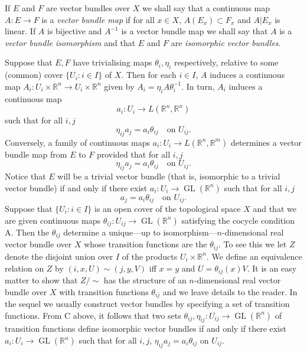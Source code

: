 If $E$ and $F$ are vector bundles over $X$ we shall say that a continuous map $A:E\to F$ is a \emph{vector bundle map} if for all $x\in X$, $A(E_x)\subset F_x$ and $A|E_x$ is linear. If $A$ is bijective and $A^{-1}$ is a vector bundle map we shall say that $A$ is a \emph{vector bundle isomorphism} and that $E$ and $F$ are \emph{isomorphic vector bundles}.

Suppose that $E,F$ have trivialising maps $\theta_i,\eta_i$ respectively, relative to some (common) cover $\{U_i:i\in I\}$ of $X$. Then for each $i\in I$, $A$ induces a continuous map $A_i:U_i\times\mathbb R^n\to U_i\times\mathbb R^n$ given by $A_i=\eta_i A\theta_i^{-1}$. In turn, $A_i$ induces a continuous map
\[ a_i:U_i\longrightarrow L(\mathbb R^n,\mathbb R^n) \]
such that for all $i,j$
\[ \eta_{ij}a_j=a_i\theta_{ij}\quad\text{on }U_{ij}. \]
Conversely, a family of continuous maps $a_i:U_i\to L(\mathbb R^n,\mathbb R^m)$ determines a vector bundle map from $E$ to $F$ provided that for all $i,j$
\begin{equation}\eta_{ij}a_j=a_i\theta_{ij}\quad\text{on }U_{ij}.\tag{C}\label{eq:1:c:1}\end{equation}
Notice that $E$ will be a trivial vector bundle (that is, isomorphic to a trivial vector bundle) if and only if there exist $a_i:U_i\to\operatorname{GL}(\mathbb R^n)$ such that for all $i,j$
\[ a_j=a_i\theta_{ij}\quad\text{on }U_{ij}. \]
Suppose that $\{U_i:i\in I\}$ is an open cover of the topological space $X$ and that we are given continuous maps $\theta_{ij}:U_{ij}\to\operatorname{GL}(\mathbb R^n)$ satisfying the cocycle condition A. Then the $\theta_{ij}$ determine a unique---up to isomorphism---$n$-dimensional real vector bundle over $X$ whose transition functions are the $\theta_{ij}$. To see this we let $Z$ denote the disjoint union over $I$ of the products $U_i\times\mathbb R^n$. We define an equivalence relation on $Z$ by $(i,x,U)\sim(j,y,V)$ iff $x=y$ and $U=\theta_{ij}(x)V$. It is an easy matter to show that $Z/{\sim}$ has the structure of an $n$-dimensional real vector bundle over $X$ with transition functions $\theta_{ij}$ and we leave details to the reader. In the sequel we usually construct vector bundles by specifying a set of transition functions. From C above, it follows that two sets $\theta_{ij},\eta_{ij}:U_{ij}\to\operatorname{GL}(\mathbb R^n)$ of transition functions define isomorphic vector bundles if and only if there exist $a_i:U_i\to\operatorname{GL}(\mathbb R^n)$ such that for all $i,j$, $\eta_{ij}a_j=a_i\theta_{ij}$ on $U_{ij}$.

